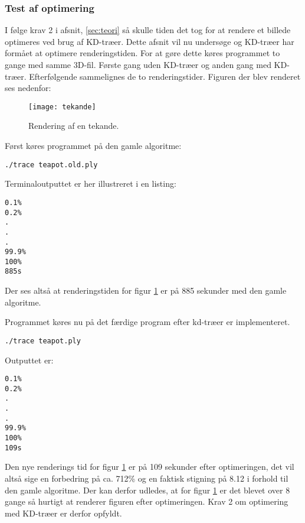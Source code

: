 \subsubsection{Test af optimering}

I følge krav 2 i afsnit, \ref{sec:teori} så skulle tiden det tog for at rendere et billede optimeres ved brug af KD-træer. Dette afsnit vil nu undersøge og KD-træer har formået at optimere renderingstiden. For at gøre dette køres programmet to gange med samme 3D-fil. Første gang uden KD-træer og anden gang med KD-træer. Efterfølgende sammelignes de to renderingstider. Figuren der blev renderet ses nedenfor:

\begin{figure}[H]
  \centering
  \texttt{[image: tekande]}
  \caption{Rendering af en tekande.}
    \label{fig:tekande}
\end{figure}

Først køres programmet på den gamle algoritme:
\begin{lstlisting}
./trace teapot.old.ply
\end{lstlisting}
Terminaloutputtet er her illustreret i en listing:
\begin{lstlisting}
0.1%
0.2%
.
.
.
99.9%
100%
885s
\end{lstlisting}

Der ses altså at renderingstiden for figur \ref{fig:tekande} er på 885 sekunder med den gamle algoritme.

Programmet køres nu på det færdige program efter kd-træer er implementeret.
\begin{lstlisting}
./trace teapot.ply
\end{lstlisting}
Outputtet er:
\begin{lstlisting}
0.1%
0.2%
.
.
.
99.9%
100%
109s
\end{lstlisting}

Den nye renderings tid for figur \ref{fig:tekande} er på 109 sekunder efter optimeringen, det vil altså sige en forbedring på ca. 712\% og en faktisk stigning på 8.12 i forhold til den gamle algoritme. Der kan derfor udledes, at for figur \ref{fig:tekande} er det blevet over 8 gange så hurtigt at renderer figuren efter optimeringen. Krav 2 om optimering med KD-træer er derfor opfyldt.   